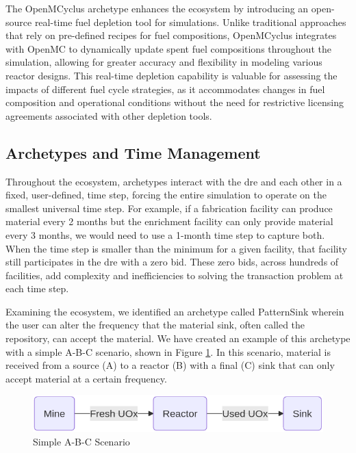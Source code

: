 The OpenMCyclus archetype \cite{openmcyclus_paper} enhances the \cyclus
ecosystem by introducing an open-source real-time fuel depletion tool for
\cyclus simulations. Unlike traditional approaches that rely on pre-defined
recipes for fuel compositions, OpenMCyclus integrates with OpenMC
\cite{romano_openmc_2015} to dynamically update spent fuel compositions
throughout the simulation, allowing for greater accuracy and flexibility in
modeling various reactor designs. This real-time depletion capability is
valuable for assessing the impacts of different fuel cycle strategies, as it
accommodates changes in fuel composition and operational conditions without the
need for restrictive licensing agreements associated with other depletion tools.

\subsection{Archetypes and Time Management}
\label{sec:archetypes_and_time_management}

Throughout the \cyclus ecosystem, archetypes interact with the \gls{dre} and
each other in a fixed, user-defined, time step, forcing the entire simulation
to operate on the smallest universal time step. For example, if a fabrication
facility can produce material every 2 months but the enrichment facility can
only provide material every 3 months, we would need to use a 1-month time step
to capture both. When the time step is smaller than the minimum for a given
facility, that facility still participates in the \gls{dre} with a zero bid.
These zero bids, across hundreds of facilities, add complexity and
inefficiencies to solving the transaction problem at each time step.

Examining the \cyclus ecosystem, we identified an archetype called PatternSink
wherein the user can alter the frequency that the material sink, often called
the repository, can accept the material. We have created an example of this
archetype with a simple A-B-C scenario, shown in Figure \ref{fig:a-b-c}. In
this scenario, material is received from a source (A) to a reactor (B) with a
final (C) sink that can only accept material at a certain frequency.

\begin{figure}[H]
    \centering
    \includegraphics[scale=0.4]{images/cyclus/a-b-c.png}
    \caption{Simple A-B-C Scenario}
    \label{fig:a-b-c}
\end{figure}

